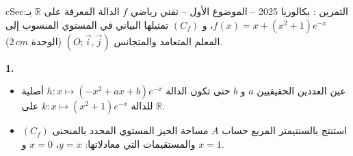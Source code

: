 \documentclass[12pt,a4paper]{article}
\newenvironment{BOX}[2]{\begin{otherlanguage}{english}\begin{arbox}{#1}{#2}}{\end{arbox}\end{otherlanguage}}
\newcounter{exo}
\newenvironment{tamrin}[1]{\stepcounter{exo}\begin{BOX}{cSec}{التمرين \theexo: #1}}{\end{BOX}}
\newcommand{\R}{\mathbb{R}}
\newenvironment{sq}{\begin{itemize}[leftmargin=2.4em,itemsep=3pt]}{\end{itemize}}
\newcommand{\qa}{\item[(أ)]}\newcommand{\qb}{\item[(ب)]}\newcommand{\qc}{\item[(جـ)]}\newcommand{\qd}{\item[(د)]}\newcommand{\qe}{\item[(هـ)]}
\newcommand{\QQ}[1]{\par\smallskip\textbf{#1.} }
\begin{document}
\begin{tamrin}{بكالوريا 2025 -- الموضوع الأول -- تقني رياضي}
$f$ الدالة المعرفة على $\R$ بـ: $f(x)=x+\left(x^{2}+1\right)e^{-x}$، و $(C_f)$ تمثيلها البياني في المستوي المنسوب إلى المعلم المتعامد والمتجانس $(O;\vec{i},\vec{j})$ (الوحدة $2\,cm$).

\QQ{1}
\begin{sq}
\qa عين العددين الحقيقيين $a$ و $b$ حتى تكون الدالة $h:x\mapsto\left(-x^{2}+ax+b\right)e^{-x}$ أصلية للدالة $k:x\mapsto\left(x^{2}+1\right)e^{-x}$ على $\R$.
\qb استنتج بالسنتيمتر المربع حساب $A$ مساحة الحيز المستوي المحدد بالمنحنى $(C_f)$ والمستقيمات التي معادلاتها: $y=x$، $x=0$ و $x=1$.
\end{sq}
\end{tamrin}
\end{document}
